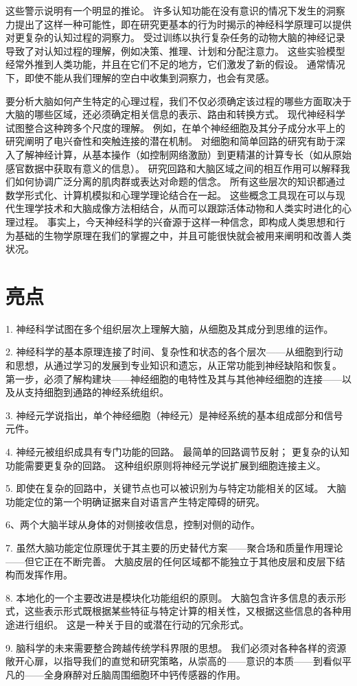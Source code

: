 这些警示说明有一个明显的推论。 
许多认知功能在没有意识的情况下发生的洞察力提出了这样一种可能性，即在研究更基本的行为时揭示的神经科学原理可以提供对更复杂的认知过程的洞察力。 
受过训练以执行复杂任务的动物大脑的神经记录导致了对认知过程的理解，例如决策、推理、计划和分配注意力。 
这些实验模型经常外推到人类功能，并且在它们不足的地方，它们激发了新的假设。 
通常情况下，即使不能从我们理解的空白中收集到洞察力，也会有灵感。


要分析大脑如何产生特定的心理过程，我们不仅必须确定该过程的哪些方面取决于大脑的哪些区域，还必须确定相关信息的表示、路由和转换方式。 
现代神经科学试图整合这种跨多个尺度的理解。 
例如，在单个神经细胞及其分子成分水平上的研究阐明了电兴奋性和突触连接的潜在机制。 
对细胞和简单回路的研究有助于深入了解神经计算，从基本操作（如控制网络激励）到更精湛的计算专长（如从原始感官数据中获取有意义的信息）。 
研究回路和大脑区域之间的相互作用可以解释我们如何协调广泛分离的肌肉群或表达对命题的信念。 
所有这些层次的知识都通过数学形式化、计算机模拟和心理学理论结合在一起。 
这些概念工具现在可以与现代生理学技术和大脑成像方法相结合，从而可以跟踪活体动物和人类实时进化的心理过程。 
事实上，今天神经科学的兴奋源于这样一种信念，即构成人类思想和行为基础的生物学原理在我们的掌握之中，并且可能很快就会被用来阐明和改善人类状况。




\section{亮点}

1. 神经科学试图在多个组织层次上理解大脑，从细胞及其成分到思维的运作。

2. 神经科学的基本原理连接了时间、复杂性和状态的各个层次——从细胞到行动和思想，从通过学习的发展到专业知识和遗忘，从正常功能到神经缺陷和恢复。 
第一步，必须了解构建块——神经细胞的电特性及其与其他神经细胞的连接——以及从支持细胞到通路的神经系统组织。


3. 神经元学说指出，单个神经细胞（神经元）是神经系统的基本组成部分和信号元件。

4. 神经元被组织成具有专门功能的回路。 
最简单的回路调节反射； 更复杂的认知功能需要更复杂的回路。 
这种组织原则将神经元学说扩展到细胞连接主义。


5. 即使在复杂的回路中，关键节点也可以被识别为与特定功能相关的区域。 
大脑功能定位的第一个明确证据来自对语言产生特定障碍的研究。


6、两个大脑半球从身体的对侧接收信息，控制对侧的动作。

7. 虽然大脑功能定位原理优于其主要的历史替代方案——聚合场和质量作用理论——但它正在不断完善。 
大脑皮层的任何区域都不能独立于其他皮层和皮层下结构而发挥作用。

8. 本地化的一个主要改进是模块化功能组织的原则。 大脑包含许多信息的表示形式，这些表示形式既根据某些特征与特定计算的相关性，又根据这些信息的各种用途进行组织。 
这是一种关于目的或潜在行动的冗余形式。


9. 脑科学的未来需要整合跨越传统学科界限的思想。 
我们必须对各种各样的资源敞开心扉，以指导我们的直觉和研究策略，从崇高的——意识的本质——到看似平凡的——全身麻醉对丘脑周围细胞环中钙传感器的作用。




